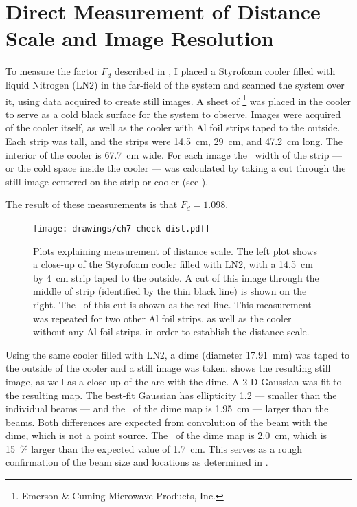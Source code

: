 \section{Direct Measurement of Distance Scale and Image Resolution} \label{sec:ch7-dist-scale}

To measure the factor $F_d$ described in , I placed a Styrofoam cooler filled with liquid Nitrogen (LN2) in the far-field of the system and scanned the system over it, using data acquired to create still images.
A sheet of \ecco\footnote{Emerson \& Cuming Microwave Products, Inc.} was placed in the cooler to serve as a cold black surface for the system to observe.
Images were acquired of the cooler itself, as well as the cooler with Al foil strips taped to the outside.
Each strip was  tall, and the strips were \SI{14.5}{\cm}, \SI{29}{\cm}, and \SI{47.2}{\cm} long.
The interior of the cooler is \SI{67.7}{\cm} wide.
For each image the \FWHM\ width of the strip --- or the cold space inside the cooler --- was calculated by taking a cut through the still image centered on the strip or cooler (see ).

The result of these measurements is that $F_d = 1.098$.

\begin{figure}
\centering
\texttt{[image: drawings/ch7-check-dist.pdf]}
\caption[Distance scale measurements]{
  Plots explaining measurement of distance scale.
  The left plot shows a close-up of the Styrofoam cooler filled with LN2, with a \SI{14.5}{\cm} by \SI{4}{\cm} strip taped to the outside.
  A cut of this image through the middle of strip (identified by the thin black line) is shown on the right.
  The \FWHM\ of this cut is shown as the red line.
  This measurement was repeated for two other Al foil strips, as well as the cooler without any Al foil strips, in order to establish the distance scale.
}
\label{fig:ch7-check-dist}
\end{figure}


Using the same cooler filled with LN2, a dime (diameter \SI{17.91}{\mm}) was taped to the outside of the cooler and a still image was taken.
 shows the resulting still image, as well as a close-up of the are with the dime.
A 2-D Gaussian was fit to the resulting map.
The best-fit Gaussian has ellipticity 1.2 --- smaller than the individual beams --- and the \FWHM\ of the dime map is \SI{1.95}{\cm} --- larger than the beams.
Both differences are expected from convolution of the beam with the dime, which is not a point source.
The \FWHM\ of the dime map is \SI{2.0}{\cm}, which is \SI{15}{\percent} larger than the expected value of \SI{1.7}{\cm}. %
This serves as a rough confirmation of the beam size and locations as determined in .

